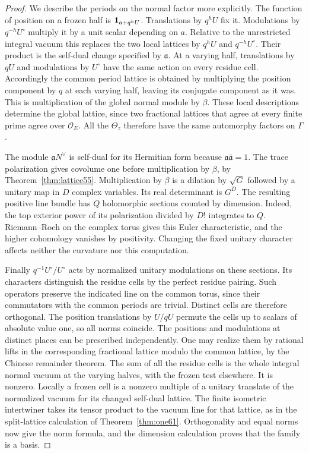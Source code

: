 \documentclass[a4paper,11pt]{article}
\theoremstyle{definition}
\theoremstyle{remark}
\numberwithin{equation}{section}
\begin{document}
\begin{proof}
We describe the periods on the normal factor more explicitly.
The function of position on a frozen half is
\({\bf1}_{a+q^hU}\). Translations by \(q^hU\) fix it. Modulations
by \(q^{-h}U^\circ\) multiply it by a unit scalar depending on
\(a\). Relative to the unrestricted integral vacuum this replaces
the two local lattices by \(q^hU\) and \(q^{-h}U^\circ\).
Their product is the self-dual change specified by \(\mathfrak a\).
At a varying half, translations by \(qU\) and modulations by
\(U^\circ\) have the same action on every residue cell.
Accordingly the common period lattice is obtained by multiplying
the position component by \(q\) at each varying half, leaving its
conjugate component as it was. This is multiplication of the
global normal module by \(\beta\). These local descriptions
determine the global lattice, since two fractional lattices that
agree at every finite prime agree over \(\mathcal O_E\).
All the \(\Theta_z\) therefore have the same automorphy factors on
\(\Gamma\).

The module \(\mathfrak a N^\vee\) is self-dual for its Hermitian
form because \(\mathfrak a\overline{\mathfrak a}=1\).
The trace polarization gives covolume one before multiplication
by \(\beta\), by Theorem~\ref{thm:lattice55}. Multiplication by
\(\beta\) is a dilation by \(\sqrt G\) followed by a unitary map
in \(D\) complex variables. Its real determinant is \(G^D\).
The resulting positive line bundle has \(Q\) holomorphic sections
counted by dimension. Indeed, the top exterior power of its
polarization divided by \(D!\) integrates to \(Q\). Riemann--Roch
on the complex torus gives this Euler characteristic, and the
higher cohomology vanishes by positivity. Changing the fixed
unitary character affects neither the curvature nor this computation.

Finally \(q^{-1}U^\circ/U^\circ\) acts by normalized unitary
modulations on these sections. Its characters distinguish the
residue cells by the perfect residue pairing. Such operators
preserve the indicated line on the common torus, since their
commutators with the common periods are trivial. Distinct cells
are therefore orthogonal. The position translations by
\(U/qU\) permute the cells up to scalars of absolute value one,
so all norms coincide. The positions and modulations at distinct
places can be prescribed independently. One may realize them
by rational lifts in the corresponding fractional lattice modulo
the common lattice, by the Chinese remainder theorem.
The sum of all the residue cells is the whole integral normal
vacuum at the varying halves, with the frozen test elsewhere.
It is nonzero. Locally a frozen cell is a nonzero multiple of a
unitary translate of the normalized vacuum for its changed
self-dual lattice. The finite isometric intertwiner takes its
tensor product to the vacuum line for that lattice, as in the
split-lattice calculation of Theorem~\ref{thm:one61}.
Orthogonality and equal norms now give the norm formula, and the
dimension calculation proves that the family is a basis.
\end{proof}
\end{document}
